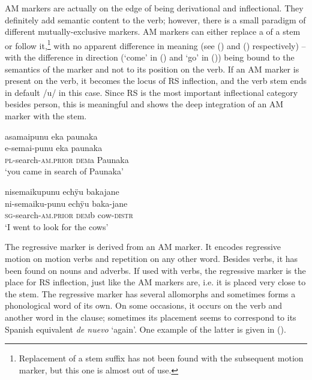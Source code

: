 AM markers are actually on the edge of being derivational and inflectional. They definitely add semantic content to the verb; however, there is a small paradigm of different mutually-exclusive markers. AM markers can either replace a  of a stem or follow it,\footnote{Replacement of a stem suffix has not been found with the subsequent motion marker, but this one is almost out of use.} with no apparent difference in meaning (see () and () respectively) – with the difference in direction (‘come’ in () and ‘go’ in ()) being bound to the semantics of the marker and not to its position on the verb. If an AM marker is present on the verb, it becomes the locus of RS inflection, and the verb stem ends in default /u/ in this case. Since RS is the most important inflectional category besides person, this is meaningful and shows the deep integration of an AM marker with the stem.

\ea\label{ex:new23-punu1}
\begingl
\glpreamble asamaipunu eka paunaka\\
\gla e-semai-punu eka paunaka\\
\textsc{pl}-search-\textsc{am.prior} \textsc{dem}a Paunaka\\
\glft ‘you came in search of Paunaka’
\endgl
\trailingcitation{[uxx-p110825l.098]}
\xe

\ea\label{ex:new23-punu2}
\begingl
\glpreamble nisemaikupunu echÿu bakajane\\
\gla ni-semaiku-punu echÿu baka-jane\\
\textsc{sg}-search-\textsc{am.prior} \textsc{dem}b cow-\textsc{distr}\\
\glft ‘I went to look for the cows’
\endgl
\trailingcitation{[mxx-n101017s-2.072]}
\xe

The regressive marker is derived from an AM marker. It encodes regressive motion on motion verbs and repetition on any other word. Besides verbs, it has been found on nouns and adverbs. If used with verbs, the regressive marker is the place for RS inflection, just like the AM markers are, i.e. it is placed very close to the stem. The regressive marker has several allomorphs and sometimes forms a phonological word of its own. On some occasions, it occurs on the verb and another word in the clause; sometimes its placement seems to correspond to its Spanish equivalent \textit{de nuevo} ‘again’. One example of the latter is given in ().

